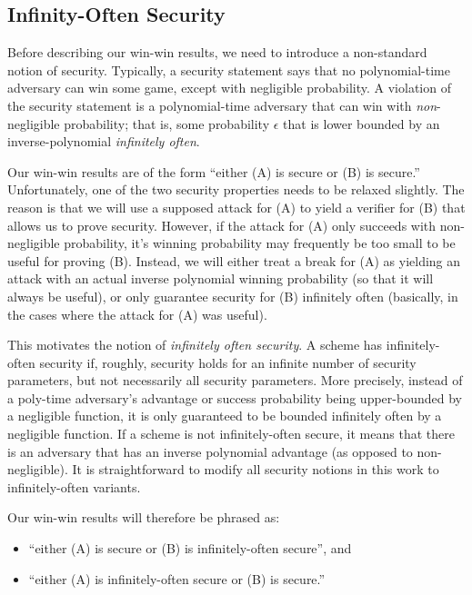 \subsection{Infinity-Often Security} 

Before describing our win-win results, we need to introduce a non-standard notion of security.  Typically, a security statement says that no polynomial-time adversary can win some game, except with negligible probability.  A violation of the security statement is a polynomial-time adversary that can win with \emph{non}-negligible probability; that is, some probability $\epsilon$ that is lower bounded by an inverse-polynomial \emph{infinitely often}.  

Our win-win results are of the form ``either (A) is secure or (B) is secure.''  Unfortunately, one of the two security properties needs to be relaxed slightly.  The reason is that we will use a supposed attack for (A) to yield a verifier for (B) that allows us to prove security.  However, if the attack for (A) only succeeds with non-negligible probability, it's winning probability may frequently be too small to be useful for proving (B).  Instead, we will either treat a break for (A) as yielding an attack with an actual inverse polynomial winning probability (so that it will always be useful), or only guarantee security for (B) infinitely often (basically, in the cases where the attack for (A) was useful).

This motivates the notion of \emph{infinitely often security}.  A scheme has infinitely-often security if, roughly, security holds for an infinite number of security parameters, but not necessarily all security parameters.  More precisely, instead of a poly-time adversary's advantage or success probability being upper-bounded by a negligible function, it is only guaranteed to be bounded infinitely often by a negligible function.  If a scheme is not infinitely-often secure, it means that there is an adversary that has an inverse polynomial advantage (as opposed to non-negligible).  It is straightforward to modify all security notions in this work to infinitely-often variants.

Our win-win results will therefore be phrased as:
\begin{itemize}
	\item ``either (A) is secure or (B) is infinitely-often secure'', and 
	\item ``either (A) is infinitely-often secure or (B) is secure.''
\end{itemize}

